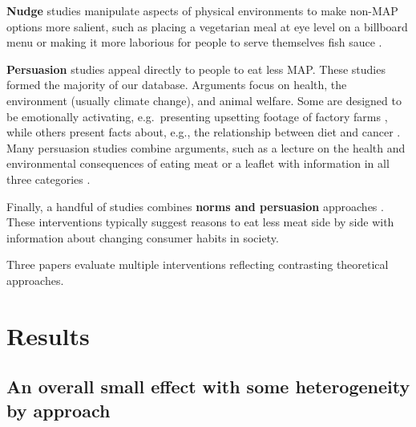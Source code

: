 \documentclass[sn-nature,pdflatex]{sn-jnl}
\begin{document}
\textbf{Nudge} studies \citep{andersson2021, kanchanachitra2020}
manipulate aspects of physical environments to make non-MAP options more
salient, such as placing a vegetarian meal at eye level on a billboard
menu \citep{andersson2021} or making it more laborious for people to
serve themselves fish sauce \citep{kanchanachitra2020}.

\textbf{Persuasion} studies
\citep{kanchanachitra2020, bochmann2017, bschaden2020, cooney2016, feltz2022, haile2021, mathur2021effectiveness, peacock2017, polanco2022, sparkman2021, abrahamse2007, acharya2004, banjerjee2019, berndsen2005, bertolaso2015, bianchi2022, fehrenbach2015, hatami2018, jalil2023, merrill2009, norris2014, shreedhar2021, weingarten2022}
appeal directly to people to eat less MAP. These studies formed the
majority of our database. Arguments focus on health, the environment
(usually climate change), and animal welfare. Some are designed to be
emotionally activating, e.g.~presenting upsetting footage of factory
farms \citep{bertolaso2015}, while others present facts about, e.g., the
relationship between diet and cancer \citep{hatami2018}. Many persuasion
studies combine arguments, such as a lecture on the health and
environmental consequences of eating meat \citep{jalil2023} or a leaflet
with information in all three categories \citep{hennessy2016}.

Finally, a handful of studies combines \textbf{norms and persuasion}
approaches \citep{hennessy2016, carfora2023, mattson2020, piester2020}.
These interventions typically suggest reasons to eat less meat side by
side with information about changing consumer habits in society.

Three papers \citep{piester2020, hennessy2016, kanchanachitra2020}
evaluate multiple interventions reflecting contrasting theoretical
approaches.

\begin{comment} 
Note that two interventions also provide free meat alternatives?
\end{comment}

\section{Results}\label{sec2}

\subsection{An overall small effect with some heterogeneity by
approach}\label{sec2.1}
\end{document}
